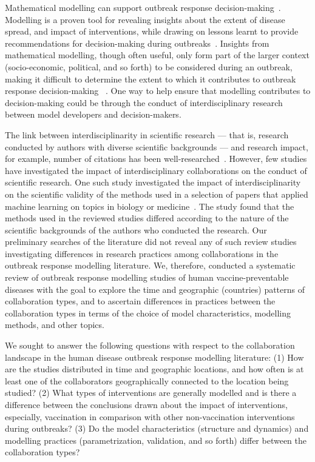 \documentclass[10pt,letterpaper]{article}
\begin{document}
Mathematical modelling can support outbreak response decision-making~\cite{Lofgren2015}. Modelling is a proven tool for revealing insights about the extent of disease spread, and impact of interventions, while drawing on lessons learnt to provide recommendations for decision-making during outbreaks~\cite{Kretzschmar2020,Whitty2014,Lofgren2015}. Insights from mathematical modelling, though often useful, only form part of the larger context (socio-economic, political, and so forth) to be considered during an outbreak, making it difficult to determine the extent to which it contributes to outbreak response decision-making ~\cite{Kretzschmar2020,Kerkhove2012}. One way to help ensure that modelling contributes to decision-making could be through the conduct of interdisciplinary research between model developers and decision-makers.

The link between interdisciplinarity in scientific research --- that is, research conducted by authors with diverse scientific backgrounds --- and research impact, for example, number of citations has been well-researched~\cite{Abramo2017,Wagner2011}. However, few studies have investigated the impact of interdisciplinary collaborations on the conduct of scientific research. One such study investigated the impact of interdisciplinarity on the scientific validity of the methods used in a selection of papers that applied machine learning on topics in biology or medicine~\cite{Littmann2020}. The study found that the methods used in the reviewed studies differed according to the nature of the scientific backgrounds of the authors who conducted the research. Our preliminary searches of the literature did not reveal any of such review studies investigating differences in research practices among collaborations in the outbreak response modelling literature. We, therefore, conducted a systematic review of outbreak response modelling studies of human vaccine-preventable diseases with the goal to explore the time and geographic (countries) patterns of collaboration types, and to ascertain differences in practices between the collaboration types in terms of the choice of model characteristics, modelling methods, and other topics. 

We sought to answer the following questions with respect to the collaboration landscape in the human disease outbreak response modelling literature: (1) How are the studies distributed in time and geographic locations, and how often is at least one of the collaborators geographically connected to the location being studied? (2) What types of interventions are generally modelled and is there a difference between the conclusions drawn about the impact of interventions, especially, vaccination in comparison with other non-vaccination interventions during outbreaks? (3) Do the model characteristics (structure and dynamics) and modelling practices (parametrization, validation, and so forth) differ between the collaboration types?    
\end{document}
